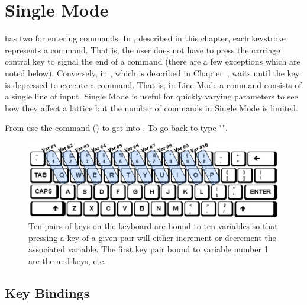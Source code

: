 \chapter{Single Mode}
\label{c:single}

\tao has two  for entering commands. In , described in this chapter, each
keystroke represents a command.  That is, the user does not have to press the carriage control key
to signal the end of a command (there are a few exceptions which are noted below). Conversely, in
, which is described in Chapter~, \tao waits until the  key
is depressed to execute a command. That is, in Line Mode a command consists of a single line of
input.  Single Mode is useful for quickly varying parameters to see how they affect a lattice but
the number of commands in Single Mode is limited.

From  use the  command () to get into . To go back to  type "".

\begin{figure}
  \centering
  \includegraphics[width=5in]{keyboard.pdf}
  \caption[Bindings of key pairs on the keyboard to variables.]
{Ten pairs of keys on the keyboard are bound to ten variables so that pressing a key of a given pair
will either increment or decrement the associated variable. The first key pair bound to variable
number 1 are the  and  keys, etc.}
  \label{f:keyboard}
\end{figure}

\section{Key Bindings}
\label{s:key.bind}

